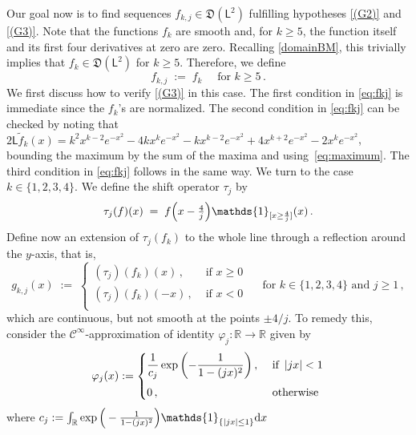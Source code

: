 \documentclass[12pt,a4paper]{article}
\theoremstyle{plain}
\theoremstyle{remark}
\newcommand{\dd}{\text{\rm d}}
\newcommand{\msf}[1]{{\mathsf #1}}
\newcommand{\mc}[1]{{\mathcal #1}}
\newcommand{\mf}[1]{{\mathfrak #1}}
\newcommand{\bb}[1]{{\mathbb #1}}
\newcommand{\pfrac}[2]{\genfrac{}{}{}{1}{#1}{#2}}
\newcommand{\mud}[1]{\left\lvert#1\right\rvert}
\newcommand{\one}{\mathds{1}}
\begin{document}
	Our goal now is to find  sequences $f_{k, j}\in \mf D(\msf{L}^2)$ fulfilling  hypotheses \ref{(G2)} and  \ref{(G3)}. Note that the  functions $f_k$ are smooth and,  for $k\geq 5$, the function itself and its first four derivatives at zero are zero. Recalling \eqref{domainBM}, this trivially implies that $f_k\in \mf D(\msf{L}^2)$ for $k\geq 5$. Therefore,  we define
	\begin{equation*}
		f_{k,j}\; := \; f_k \quad \text{ for } k\geq 5\,.
	\end{equation*}
	We first discuss how to verify \ref{(G3)} in this case. The first condition in \eqref{eq:fkj} is immediate since the $f_k$'s are normalized. The second condition in \eqref{eq:fkj} can be checked by noting that 
	$2\msf{L}\widetilde f_{k}(x) = k^{2} x^{k-2} e^{- x^{2}} - 4 k x^{k} e^{- x^{2}} - k x^{k-2} e^{- x^{2}}+ 4 x^{k+2} e^{- x^{2}} - 2 x^{k} e^{- x^{2}}
	$,
	bounding the maximum by the sum of the maxima and using~\eqref{eq:maximum}. The third condition in \eqref{eq:fkj} follows in the same way.
	We turn to the case $k\in\{1,2,3,4\}$. We define the  shift operator $\tau_{j}$ by
	\begin{equation*}
		\tau_{j}(f)(x) \;=\; f\Big(x - \pfrac{4}{j}\Big)\one_{[x \geq \frac{4}{j}]}(x)\,.
	\end{equation*}
	Define now an extension of $\tau_{j}(f_k)$ to the whole line through a reflection around the $y$-axis, that is,
	\begin{equation*}
		g_{k,j}(x) \;:=\; \begin{cases}
			(\tau_{j})(f_k)(x)\,, & \text{ if } x\geq 0\\
			(\tau_{j})(f_k)(-x)\,, & \text{ if } x< 0\\
		\end{cases} \quad \text{ for }k \in \{1,2,3,4\} \text{ and  }  {j\geq 1}\,,
	\end{equation*}
	which are continuous, but not smooth at the points $\pm 4/j$. To remedy this, consider the $\mc C^\infty$-approximation of identity  $\varphi_j : \bb{R} \to \bb{R}$ given by
	\begin{align*}
		\varphi_j(x) :=
		\begin{cases}
			\displaystyle\frac{1}{c_j}\exp{\left(- \frac{1}{1 - (jx)^2}\right)}\,, &\text{ if } \mud{jx} < 1\vspace{5pt}\\
			0\,, &\text{ otherwise}
		\end{cases}
	\end{align*}
	where $
	c_j := \int_{\bb{R}}\exp{\Big(- \frac{1}{1 - (jx)^2}\Big)}\one_{\{|jx|\leq 1\}}\dd x$
\end{document}
